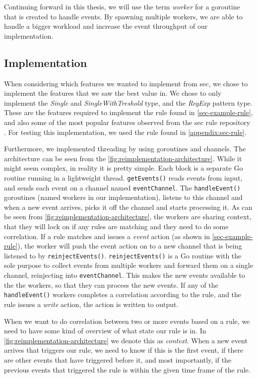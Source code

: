 Continuing forward in this thesis, we will use the term \textit{worker} for a goroutine that is created to handle events. By spawning multiple workers, we are able to handle a bigger workload and increase the event throughput of our implementation.

\subsection{Implementation}
When considering which features we wanted to implement from \acrshort{sec}, we chose to implement the features that we saw the best value in. We chose to only implement the \textit{Single} and \textit{SingleWithTreshold} type, and the \textit{RegExp} pattern type. These are the features required to implement the rule found in \cref{sec-example-rule}, and also some of the most popular features observed from the \acrshort{sec} rule repository \cite{sec-rulesets}. For testing this implementation, we used the rule found in \cref{appendix:sec-rule}.

Furthermore, we implemented threading by using goroutines and channels. The architecture can be seen from the \cref{fig:reimplementation-architecture}. While it might seem complex, in reality it is pretty simple. Each block is a separate Go routine running in a lightweight thread. \lstinline{getEvents()} reads events from input, and sends each event on a channel named \lstinline{eventChannel}. The \lstinline{handleEvent()} goroutines (named workers in our implementation), listens to this channel and when a new event arrives, picks it off the channel and starts processing it. As can be seen from \cref{fig:reimplementation-architecture}, the workers are sharing context, that they will lock on if any rules are matching and they need to do some correlation. If a rule matches and issues a \textit{event} action (as shown in \cref{sec-example-rule}), the worker will push the event action on to a new channel that is being listened to by \lstinline{reinjectEvents()}. \lstinline{reinjectEvents()} is a Go routine with the sole purpose to collect events from multiple workers and forward them on a single channel, reinjecting into \lstinline{eventChannel}. This makes the new events available to the the workers, so that they can process the new events. If any of the \lstinline{handleEvent()} workers completes a correlation according to the rule, and the rule issues a \textit{write} action, the action is written to output.

When we want to do correlation between two or more events based on a rule, we need to have some kind of overview of what state our rule is in. In \cref{fig:reimplementation-architecture} we denote this as \textit{context}. When a new event arrives that triggers our rule, we need to know if this is the first event, if there are other events that have triggered before it, and most importantly, if the previous events that triggered the rule is within the given time frame of the rule.

